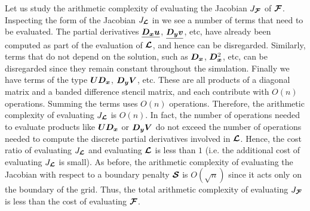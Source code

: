 Let us study the arithmetic complexity of evaluating the Jacobian $J_{\bm{\mathcal{F}}}$ of $\bm{\mathcal{F}}$. Inspecting the form of the Jacobian $J_{\bm{\mathcal{L}}}$ in  we see a number of terms that need to be evaluated. The partial derivatives $\underline{\bm{D_x} \bm{u}}$, $\underline{\bm{D_y} \bm{v}}$, etc, have already been computed as part of the evaluation of $\bm{\mathcal{L}}$, and hence can be disregarded. Similarly, terms that do not depend on the solution, such as $\bm{D_x}$, $\bm{D_x}^2$, etc, can be disregarded since they remain constant throughout the simulation. Finally we have terms of the type $\bm{U} \bm{D_x}$, $\bm{D_y} \bm{V}$, etc. These are all products of a diagonal matrix and a banded difference stencil matrix, and each contribute with $O(n)$ operations. Summing the terms uses $O(n)$ operations. Therefore, the arithmetic complexity of evaluating $J_{\bm{\mathcal{L}}}$ is $O(n)$. In fact, the number of operations needed to evaluate products like $\bm{U} \bm{D_x}$ or $\bm{D_y} \bm{V}$ do not exceed the number of operations needed to compute the discrete partial derivatives involved in $\bm{\mathcal{L}}$. Hence, the cost ratio of evaluating $J_{\bm{\mathcal{L}}}$ and evaluating $\bm{\mathcal{L}}$ is less than $1$ (i.e. the additional cost of evaluating $J_{\bm{\mathcal{L}}}$ is small). As before, the arithmetic complexity of evaluating the Jacobian with respect to a boundary penalty $\bm{\mathcal{S}}$ is $O(\sqrt{n})$ since it acts only on the boundary of the grid. Thus, the total arithmetic complexity of evaluating $J_{\bm{\mathcal{F}}}$ is less than the cost of evaluating $\bm{\mathcal{F}}$.


